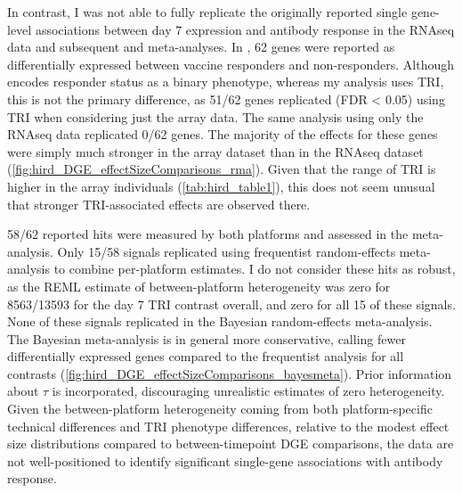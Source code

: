 In contrast, I was not able to fully replicate the originally reported single gene-level associations between day 7 expression and antibody response in the \gls{RNAseq} data and subsequent and meta-analyses.
In \autocite{sobolev2016AdjuvantedInfluenzaH1N1Vaccination}, 62 genes were reported as differentially expressed between vaccine responders and non-responders.
Although \autocite{sobolev2016AdjuvantedInfluenzaH1N1Vaccination} encodes responder status as a binary phenotype, whereas my analysis uses \gls{TRI}, this is not the primary difference, as 51/62 genes replicated (\gls{FDR} < 0.05) using \gls{TRI} when considering just the array data.
The same analysis using only the \gls{RNAseq} data replicated 0/62 genes.
The majority of the effects for these genes were simply much stronger in the array dataset than in the RNAseq dataset (\cref{fig:hird_DGE_effectSizeComparisons_rma}).
Given that the range of \gls{TRI} is higher in the array individuals (\cref{tab:hird_table1}), this does not seem unusual that stronger \gls{TRI}-associated effects are observed there.
%

58/62 reported hits were measured by both platforms and assessed in the meta-analysis.
Only 15/58 signals replicated using frequentist random-effects meta-analysis to combine per-platform estimates.
I do not consider these hits as robust, as the \gls{REML} estimate of between-platform heterogeneity was zero for 8563/13593 for the day 7 TRI contrast overall, and zero for all 15 of these signals.
None of these signals replicated in the Bayesian random-effects meta-analysis.
The Bayesian meta-analysis is in general more conservative, calling fewer differentially expressed genes compared to the frequentist analysis for all contrasts (\cref{fig:hird_DGE_effectSizeComparisons_bayesmeta}).
Prior information about $\tau$ is incorporated, discouraging unrealistic estimates of zero heterogeneity.
Given the between-platform heterogeneity coming from both platform-specific technical differences and \gls{TRI} phenotype differences, relative to the modest effect size distributions compared to between-timepoint \gls{DGE} comparisons, the data are not well-positioned to identify significant single-gene associations with antibody response.
%

